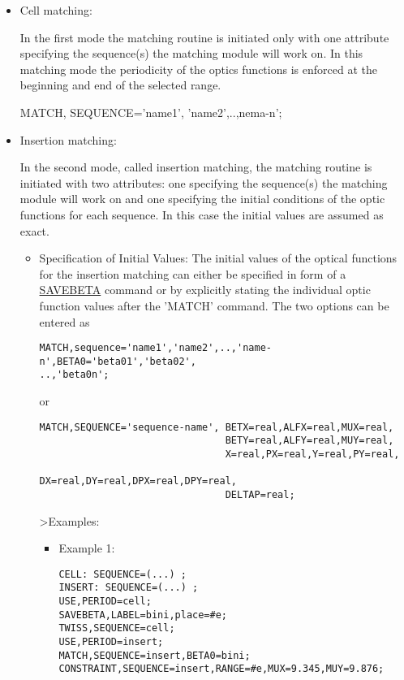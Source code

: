 \begin{itemize}
	\item \href{cell}{}Cell matching:


In the first mode the matching routine is initiated only with one
 attribute specifying the sequence(s) the matching module will work on. In
 this matching mode the periodicity of the optics functions is enforced
 at the beginning and end of the selected range.
 

MATCH, SEQUENCE='name1', 'name2',..,nema-n';
 
 
	\item 
 Insertion matching:


 In the second mode, called insertion matching, the matching routine
 is initiated with two attributes: one specifying the sequence(s) the matching
 module will work on and one specifying the initial conditions of the optic
 functions for each sequence. In this case the initial values are assumed
 as exact.
 
\begin{itemize}
	\item 
 Specification of Initial Values: The initial values of the optical functions
 for the insertion matching can either be specified in form of a \href{../control/general.html#savebeta}{SAVEBETA}
 command or by explicitly stating the individual optic function values after
 the 'MATCH' command. The two options can be entered as
\begin{verbatim}
MATCH,sequence='name1','name2',..,'name-n',BETA0='beta01','beta02',
..,'beta0n';
\end{verbatim}
 or
 
\begin{verbatim}
MATCH,SEQUENCE='sequence-name', BETX=real,ALFX=real,MUX=real,
                                BETY=real,ALFY=real,MUY=real,
                                X=real,PX=real,Y=real,PY=real,
                                DX=real,DY=real,DPX=real,DPY=real,
                                DELTAP=real;
\end{verbatim}
 \textgreater Examples:
 
\begin{itemize}
	\item 
 Example 1:
\begin{verbatim}
CELL: SEQUENCE=(...) ;
INSERT: SEQUENCE=(...) ;
USE,PERIOD=cell;
SAVEBETA,LABEL=bini,place=#e;
TWISS,SEQUENCE=cell;
USE,PERIOD=insert;
MATCH,SEQUENCE=insert,BETA0=bini;
CONSTRAINT,SEQUENCE=insert,RANGE=#e,MUX=9.345,MUY=9.876;
\end{verbatim}


\end{itemize}
\end{itemize}
\end{itemize}
